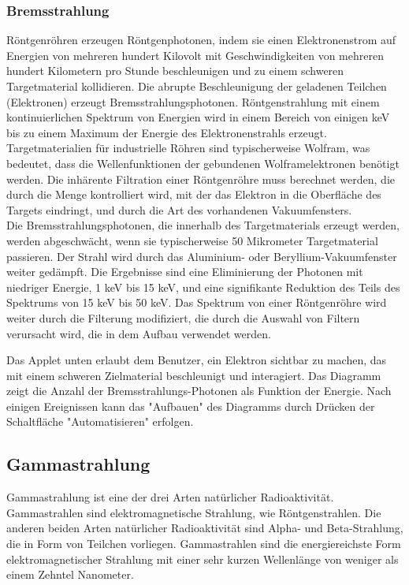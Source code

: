 \subsubsection{Bremsstrahlung}
Röntgenröhren erzeugen Röntgenphotonen, indem sie einen Elektronenstrom auf Energien von mehreren hundert Kilovolt mit Geschwindigkeiten von mehreren hundert Kilometern pro Stunde beschleunigen und zu einem schweren Targetmaterial kollidieren. Die abrupte Beschleunigung der geladenen Teilchen (Elektronen) erzeugt Bremsstrahlungsphotonen. Röntgenstrahlung mit einem kontinuierlichen Spektrum von Energien wird in einem Bereich von einigen keV bis zu einem Maximum der Energie des Elektronenstrahls erzeugt. Targetmaterialien für industrielle Röhren sind typischerweise Wolfram, was bedeutet, dass die Wellenfunktionen der gebundenen Wolframelektronen benötigt werden. Die inhärente Filtration einer Röntgenröhre muss berechnet werden, die durch die Menge kontrolliert wird, mit der das Elektron in die Oberfläche des Targets eindringt, und durch die Art des vorhandenen Vakuumfensters.\\
Die Bremsstrahlungsphotonen, die innerhalb des Targetmaterials erzeugt werden, werden abgeschwächt, wenn sie typischerweise 50 Mikrometer Targetmaterial passieren. Der Strahl wird durch das Aluminium- oder Beryllium-Vakuumfenster weiter gedämpft. Die Ergebnisse sind eine Eliminierung der Photonen mit niedriger Energie, 1 keV bis 15 keV, und eine signifikante Reduktion des Teils des Spektrums von 15 keV bis 50 keV. Das Spektrum von einer Röntgenröhre wird weiter durch die Filterung modifiziert, die durch die Auswahl von Filtern verursacht wird, die in dem Aufbau verwendet werden.

Das Applet unten erlaubt dem Benutzer, ein Elektron sichtbar zu machen, das mit einem schweren Zielmaterial beschleunigt und interagiert. Das Diagramm zeigt die Anzahl der Bremsstrahlungs-Photonen als Funktion der Energie. Nach einigen Ereignissen kann das "Aufbauen" des Diagramms durch Drücken der Schaltfläche "Automatisieren" erfolgen.
\subsection{Gammastrahlung}
Gammastrahlung ist eine der drei Arten natürlicher Radioaktivität. Gammastrahlen sind elektromagnetische Strahlung, wie Röntgenstrahlen. Die anderen beiden Arten natürlicher Radioaktivität sind Alpha- und Beta-Strahlung, die in Form von Teilchen vorliegen. Gammastrahlen sind die energiereichste Form elektromagnetischer Strahlung mit einer sehr kurzen Wellenlänge von weniger als einem Zehntel Nanometer.

